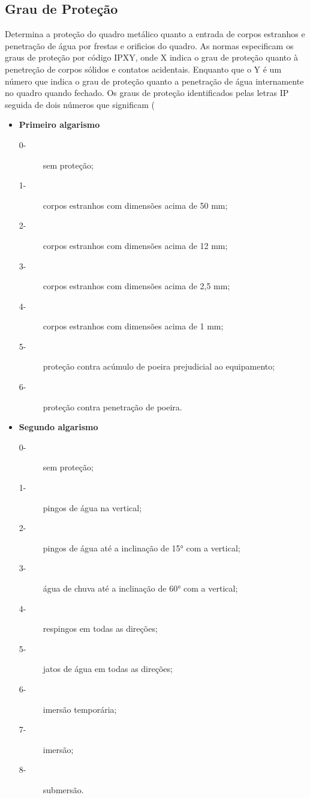 \subsection{Grau de Proteção}
Determina a proteção do quadro metálico quanto a entrada de corpos estranhos e penetração de água por frestas e orificios do quadro. As normas especificam os graus de proteção por código IPXY, onde X indica o grau de proteção quanto à penetreção de corpos sólidos e contatos acidentais. Enquanto que o Y é um número que indica o grau de proteção quanto a penetração de água internamente no quadro quando fechado. 
Os graus de proteção identificados pelas letras IP seguida de dois números que significam (%

\begin{itemize}
\item \textbf{Primeiro algarismo}
 	\begin{description}
 	\item[0-] sem proteção;
 	\item[1-] corpos estranhos com dimensões acima de 50 mm;
 	\item[2-] corpos estranhos com dimensões acima de 12 mm;
 	\item[3-] corpos estranhos com dimensões acima de 2,5 mm;
 	\item[4-] corpos estranhos com dimensões acima de 1 mm;
 	\item[5-] proteção contra acúmulo de poeira prejudicial ao equipamento;
 	\item[6-] proteção contra penetração de poeira.
 	\end{description}
 	
 \item \textbf{Segundo algarismo}
 
 		\begin{description}
 		\item[0-] sem proteção;
 		\item[1-] pingos de água na vertical;
 		\item[2-] pingos de água até a inclinação de 15° com a vertical;
 		\item[3-] água de chuva até a inclinação de 60° com a vertical;
 		\item[4-] respingos em todas as direções;
 		\item[5-] jatos de água em todas as direções;
 		\item[6-] imersão temporária;
 		\item[7-] imersão;
 		\item[8-] submersão.
 		\end{description}
\end{itemize}



